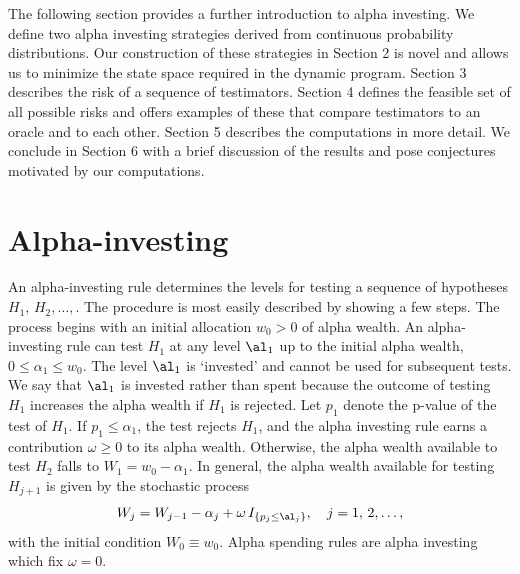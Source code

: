 \documentclass[12pt]{article}
\begin{document}
 The following section provides a further introduction to alpha investing.  We
 define two alpha investing strategies derived from continuous probability
 distributions.  Our construction of these strategies in Section 2 is novel and
 allows us to minimize the state space required in the dynamic program.  Section
 3 describes the risk of a sequence of testimators.  Section 4 defines the
 feasible set of all possible risks and offers examples of these that compare
 testimators to an oracle and to each other.  Section 5 describes the
 computations in more detail.  We conclude in Section 6 with a brief discussion
 of the results and pose conjectures motivated by our computations.



\section{ Alpha-investing }

 An alpha-investing rule \citep{fosterstine08} determines the levels for testing
 a sequence of hypotheses $H_1, \,H_2, \dots,$.  The procedure is most easily described
 by showing a few steps.  The process begins with an initial allocation $w_0 >
 0$ of alpha wealth.    An alpha-investing rule can test $H_1$ at
 any level $\al_1$ up to the initial alpha wealth, $0 \le \alpha_1 \le w_0$.
  The level $\al_1$ is `invested' and cannot be used for subsequent tests.  We
 say that $\al_1$ is invested rather than spent because  the
 outcome of testing $H_1$ increases the alpha wealth if $H_1$ is rejected.  Let $p_1$ denote
 the p-value of the test of $H_1$.  If $p_1 \le \alpha_1$, the test rejects
 $H_1$, and the alpha investing rule earns a contribution $\omega \ge
 0$ to its alpha wealth.  Otherwise, the alpha wealth available to test $H_2$
 falls to $W_1 = w_0 - \alpha_1$.  In general, the alpha wealth available for
 testing $H_{j+1}$ is given by the stochastic process
 \begin{equation}
    W_j = W_{j-1} - \alpha_j + \omega \, I_{\{p_j \le \al_j\}}, 
       \quad j = 1,\,2,\ldots,
 \label{eq:Wj}
 \end{equation}
 with the initial condition $W_0 \equiv w_0$.  Alpha spending rules are alpha
 investing which fix $\omega = 0$.
\end{document}
